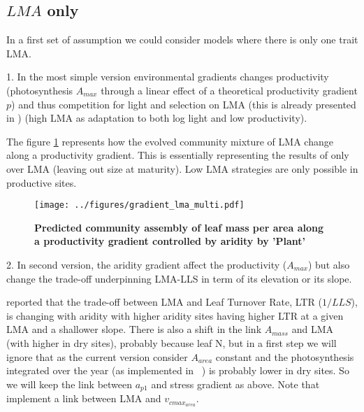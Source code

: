 \documentclass[a4paper,11pt]{article}
\begin{document}
\clearpage

\subsection{$LMA$ only}

In a first set of assumption we could consider models where there is only one trait LMA.


1. In the most simple version environmental gradients changes productivity (photosynthesis $A_{max}$ through a linear effect of a theoretical productivity gradient $p$) and
thus competition for light and selection on LMA (this is already presented in \citet{Falster-2017}) (high LMA as adaptation to both log light and low productivity).

The figure \ref{fig:lma} represents how the evolved community mixture of LMA change along a productivity gradient. This is essentially representing the results of \citet{Falster-2017} only over LMA (leaving out size at maturity). Low LMA strategies are only possible in productive sites.

\begin{figure}[ht]
\centering
\texttt{[image: ../figures/gradient\_lma\_multi.pdf]}
\caption{\textbf{Predicted community assembly of leaf mass per area along a productivity gradient controlled by aridity by 'Plant' \citep[see][]{Falster-2016}}
\label{fig:lma}}
\end{figure}

\clearpage

2. In second version, the aridity gradient affect the productivity ($A_{max}$) but also change the trade-off underpinning LMA-LLS in term of its elevation or its slope.

\citet{Wright-2005} reported that the trade-off between LMA and Leaf Turnover Rate, LTR ($1/LLS$), is changing with aridity with higher aridity sites having higher LTR at a given LMA and a shallower slope. There is also a shift in the link $A_{mass}$ and LMA (with higher in dry sites), probably because leaf N, but in a first step we will ignore that as the current version consider $A_{area}$ constant and the photosynthesis integrated over the year (as implemented in \plant\ ) is probably lower in dry sites. So we will keep the link between $a_{p1}$ and stress gradient as above. Note that \citet{Sakschewski-2015} implement a link between LMA and $v_{cmax_{area}}$.
\end{document}
